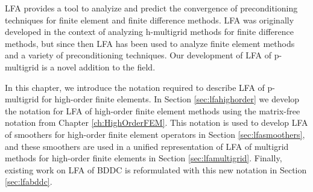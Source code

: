 LFA provides a tool to analyize and predict the convergence of preconditioning techniques for finite element and finite difference methods.
LFA \cite{brandt1977multi} was originally developed in the context of analyzing h-multigrid methods for finite difference methods, but since then LFA has been used to analyze finite element methods and a variety of preconditioning techniques.
Our development of LFA of p-multigrid is a novel addition to the field.

In this chapter, we introduce the notation required to describe LFA of p-multigrid for high-order finite elements.
In Section \ref{sec:lfahighorder} we develop the notation for LFA of high-order finite element methods using the matrix-free notation from Chapter \ref{ch:HighOrderFEM}.
This notation is used to develop LFA of smoothers for high-order finite element operators in Section \ref{sec:lfasmoothers}, and these smoothers are used in a unified representation of LFA of multigrid methods for high-order finite elements in Section \ref{sec:lfamultigrid}.
Finally, existing work on LFA of BDDC is reformulated with this new notation in Section \ref{sec:lfabddc}.
